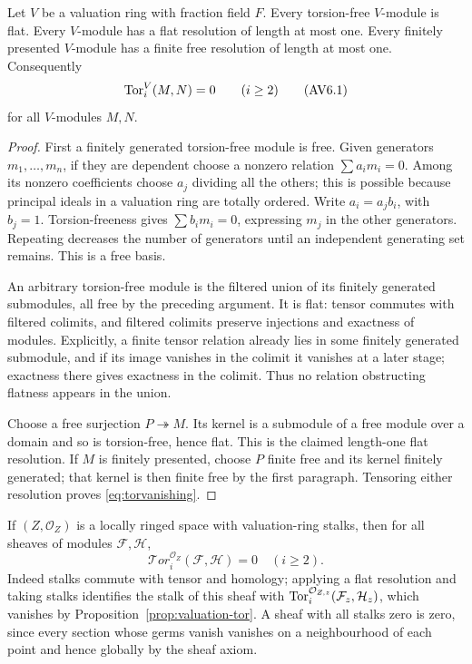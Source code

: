 \begin{proposition}
\label{prop:valuation-tor}
Let $V$ be a valuation ring with fraction field $F$. Every torsion-free
$V$-module is flat. Every $V$-module has a flat resolution of length at
most one. Every finitely presented $V$-module has a finite free
resolution of length at most one. Consequently
\[
 \operatorname{Tor}_i^V(M,N)=0\qquad(i\ge2)
 \tag{AV6.1}\label{eq:torvanishing}
\]
for all $V$-modules $M,N$.
\end{proposition}
\begin{proof}
First a finitely generated torsion-free module is free. Given generators
$m_1,\ldots,m_n$, if they are dependent choose a nonzero relation
$\sum a_i m_i=0$. Among its nonzero coefficients choose $a_j$ dividing
all the others; this is possible because principal ideals in a valuation
ring are totally ordered. Write $a_i=a_jb_i$, with $b_j=1$.
Torsion-freeness gives $\sum b_i m_i=0$, expressing $m_j$ in the other
generators. Repeating decreases the number of generators until an
independent generating set remains. This is a free basis.

An arbitrary torsion-free module is the filtered union of its finitely
generated submodules, all free by the preceding argument. It is flat:
tensor commutes with filtered colimits, and filtered colimits preserve
injections and exactness of modules. Explicitly, a finite tensor relation
already lies in some finitely generated submodule, and if its image
vanishes in the colimit it vanishes at a later stage; exactness there
gives exactness in the colimit. Thus no relation obstructing flatness
appears in the union.

Choose a free surjection $P\twoheadrightarrow M$. Its kernel is a
submodule of a free module over a domain and so is torsion-free, hence
flat. This is the claimed length-one flat resolution. If $M$ is finitely
presented, choose $P$ finite free and its kernel finitely generated;
that kernel is then finite free by the first paragraph. Tensoring either
resolution proves \eqref{eq:torvanishing}.
\end{proof}

If $(Z,\mathcal O_Z)$ is a locally ringed space with valuation-ring
stalks, then for all sheaves of modules $\mathcal F,\mathcal H$,
\[
 \mathcal{T}or_i^{\mathcal O_Z}(\mathcal F,\mathcal H)=0\quad(i\ge2).
 \tag{AV6.2}\label{eq:sheaf-tor}
\]
Indeed stalks commute with tensor and homology; applying a flat resolution
and taking stalks identifies the stalk of this sheaf with
$\operatorname{Tor}_i^{\mathcal O_{Z,z}}(\mathcal F_z,\mathcal H_z)$, which vanishes
by Proposition~\ref{prop:valuation-tor}. A sheaf with all stalks zero is
zero, since every section whose germs vanish vanishes on a neighbourhood
of each point and hence globally by the sheaf axiom.

